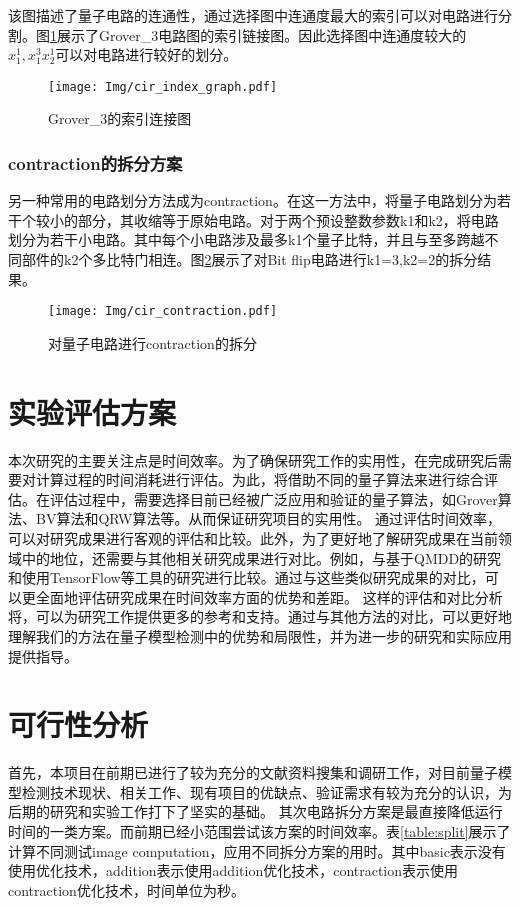 该图描述了量子电路的连通性，通过选择图中连通度最大的索引可以对电路进行分割。图\ref{fig:addition}展示了Grover\_3电路图的索引链接图。因此选择图中连通度较大的$x_1^1,x_1^3x_2^1$可以对电路进行较好的划分。
 
\begin{figure}[!htbp]
	\centering
	\texttt{[image: Img/cir\_index\_graph.pdf]}
	\caption{Grover\_3的索引连接图}
	\label{fig:addition}
\end{figure} 
\subsubsection{contraction的拆分方案}\label{contraction}
另一种常用的电路划分方法成为contraction。在这一方法中，将量子电路划分为若干个较小的部分，其收缩等于原始电路。对于两个预设整数参数k1和k2，将电路划分为若干小电路。其中每个小电路涉及最多k1个量子比特，并且与至多跨越不同部件的k2个多比特门相连。图\ref{fig:contraction}展示了对Bit flip电路进行k1=3,k2=2的拆分结果。
\begin{figure}[!htbp]
	\centering
	\texttt{[image: Img/cir\_contraction.pdf]}
	\caption{对量子电路进行contraction的拆分}
	\label{fig:contraction}
\end{figure} 

\section{实验评估方案}
本次研究的主要关注点是时间效率。为了确保研究工作的实用性，在完成研究后需要对计算过程的时间消耗进行评估。为此，将借助不同的量子算法来进行综合评估。在评估过程中，需要选择目前已经被广泛应用和验证的量子算法，如Grover算法、BV算法和QRW算法等。从而保证研究项目的实用性。
通过评估时间效率，可以对研究成果进行客观的评估和比较。此外，为了更好地了解研究成果在当前领域中的地位，还需要与其他相关研究成果进行对比。例如，与基于QMDD的研究和使用TensorFlow等工具的研究进行比较。通过与这些类似研究成果的对比，可以更全面地评估研究成果在时间效率方面的优势和差距。
这样的评估和对比分析将，可以为研究工作提供更多的参考和支持。通过与其他方法的对比，可以更好地理解我们的方法在量子模型检测中的优势和局限性，并为进一步的研究和实际应用提供指导。
\section{可行性分析}
首先，本项目在前期已进行了较为充分的文献资料搜集和调研工作，对目前量子模型检测技术现状、相关工作、现有项目的优缺点、验证需求有较为充分的认识，为后期的研究和实验工作打下了坚实的基础。
其次电路拆分方案是最直接降低运行时间的一类方案。而前期已经小范围尝试该方案的时间效率。表\ref{table:split}展示了计算不同测试image computation，应用不同拆分方案的用时。其中basic表示没有使用优化技术，addition表示使用addition优化技术，contraction表示使用contraction优化技术，时间单位为秒。

